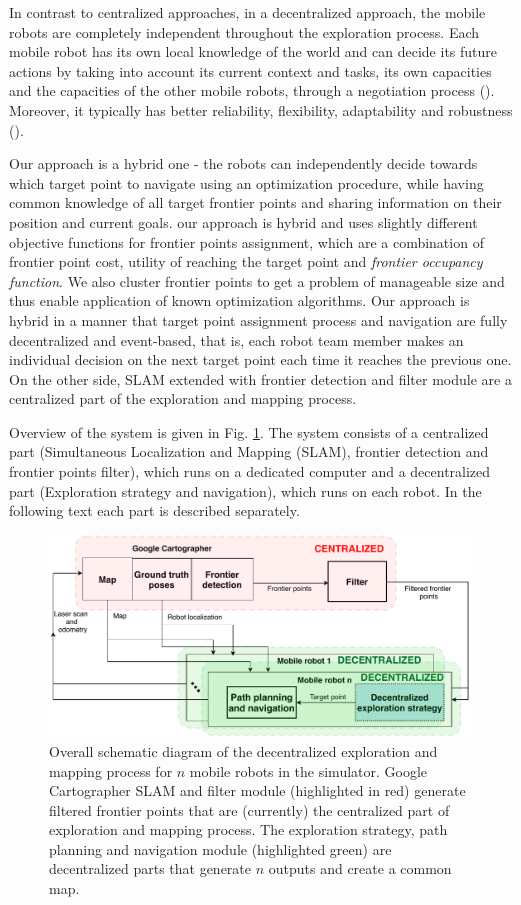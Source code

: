 In contrast to centralized approaches, in a decentralized approach, the mobile robots are completely independent throughout the exploration process. Each mobile robot has its own local knowledge of the world and can decide its future actions by taking into account its current context and tasks, its own capacities and the capacities of the other mobile robots, through a negotiation process (\cite{Yan2013}). Moreover, it typically has better reliability, flexibility, adaptability and robustness (\cite{Zlot2002}). 

Our approach is a hybrid one - the robots can independently decide towards which target point to navigate using an optimization procedure, while having common knowledge of all target frontier points and sharing information on their position and current goals.  our approach is hybrid and uses slightly different objective functions for frontier points assignment, which are a combination of frontier point cost, utility of reaching the target point and \textit{frontier occupancy function}. We also cluster frontier points to get a problem of manageable size and thus enable application of known optimization algorithms. 
Our approach is hybrid in a manner that target point assignment process and navigation are fully decentralized and event-based, that is, each robot team member makes an individual decision on the next target point each time it reaches the previous one. On the other side, SLAM extended with frontier detection and filter module are a centralized part of the exploration and mapping process.

Overview of the system is given in Fig. \ref{fig:exploration-strategy}. The system consists of a centralized part (Simultaneous Localization and Mapping (SLAM), frontier detection and frontier points filter), which runs on a dedicated computer and a decentralized part (Exploration strategy and navigation), which runs on each robot. In the following text each part is described separately.

\begin{figure}[t!]
	\centering\includegraphics[width=1.0\columnwidth]{./pictures/diagram_exploration.pdf}
	\caption{Overall schematic diagram of the decentralized exploration and mapping process for $n$ mobile robots in the simulator. Google Cartographer SLAM and filter module (highlighted in red) generate filtered frontier points that are (currently) the centralized part of exploration and mapping process. The exploration strategy, path planning and navigation module (highlighted green) are decentralized parts that generate $n$ outputs and create a common map.}
	\label{fig:exploration-strategy}
\end{figure}
